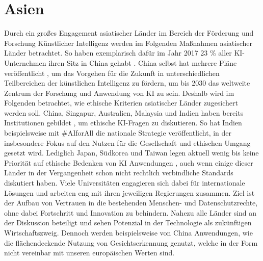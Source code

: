 \section{Asien}\label{sec:asien}
Durch ein großes Engagement asiatischer Länder im Bereich der Förderung und Forschung \cite[S. 46]{tsinghuauniversity} Künstlicher Intelligenz werden im Folgenden Maßnahmen asiatischer Länder betrachtet.
So haben exemplarisch dafür im Jahr 2017 23 \% aller KI-Unternehmen ihren Sitz in China gehabt \cite[S. 142]{ding}.
China selbst hat mehrere Pläne veröffentlicht \cite[S. 8]{ding}, um das Vorgehen für die Zukunft in unterschiedlichen Teilbereichen der künstlichen Intelligenz zu fördern, um bis 2030 das weltweite Zentrum der Forschung und Anwendung von KI zu sein.
Deshalb wird im Folgenden betrachtet, wie ethische Kriterien asiatischer Länder zugesichert werden soll.
\ab 
China, Singapur, Australien, Malaysia und Indien haben bereits Institutionen gebildet \cite{mit2019}, um ethische KI-Fragen zu diskutieren.
So hat Indien beispielsweise mit \#AIforAll \cite{nitiaayog2018} die nationale Strategie veröffentlicht, in der insbesondere Fokus auf den Nutzen für die Gesellschaft und ethischen Umgang gesetzt wird.
Lediglich Japan, Südkorea und Taiwan legen aktuell wenig bis keine Priorität auf ethische Bedenken von KI Anwendungen \cite{mit2019}, auch wenn einige dieser Länder in der Vergangenheit schon nicht rechtlich verbindliche Standards diskutiert haben.
Viele Universitäten engagieren sich dabei für internationale Lösungen und arbeiten eng mit ihren jeweiligen Regierungen zusammen.
Ziel ist der Aufbau von Vertrauen in die bestehenden Menschen- und Datenschutzrechte, ohne dabei Fortschritt und Innovation zu behindern.
Nahezu alle Länder sind an der Diskussion beteiligt und sehen Potenzial in der Technologie als zukünftigen Wirtschaftszweig.
Dennoch werden beispielsweise von China Anwendungen, wie die flächendeckende Nutzung von Gesichtserkennung \cite{mozur2018} genutzt, welche in der Form nicht vereinbar mit unseren europäischen Werten sind.